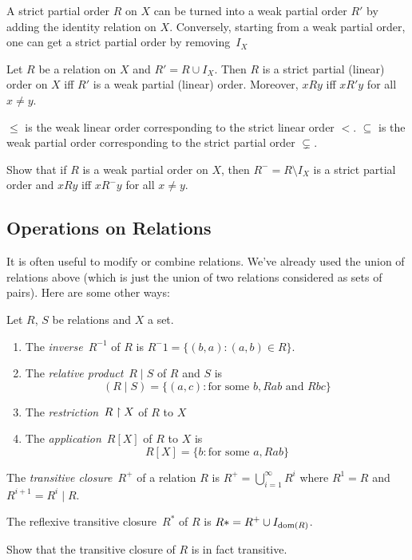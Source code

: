 \documentclass[misc]{subfiles}
\begin{document}
A strict partial order $R$ on $X$ can be turned into a weak partial
order $R'$ by adding the identity relation on $X$.
Conversely, starting from a weak partial order, one can get a strict
partial order by removing~$I_{X}$

\begin{prop}
Let $R$ be a relation on $X$ and $R'= R \cup I{}_{X}$. Then
$R$ is a strict partial (linear) order on $X$ iff $R'$ is a weak
partial (linear) order. Moreover, $xRy$ iff $xR'y$ for all $x\neq y$.\end{prop}

\begin{ex}
$\le$ is the weak linear order corresponding to the strict linear
order $<$. $\subseteq$ is the weak partial order corresponding to
the strict partial order $\subsetneq$.
\end{ex}

\begin{prob}
Show that if $R$ is a weak partial order on $X$, then $R^{-} = R\setminus I_{X}$
is a strict partial order and $xRy$ iff $xR^{-}y$ for all $x\neq y$.\end{prob}

\subsection{Operations on Relations}

It is often useful to modify or combine relations. We've already used the union of relations above (which is just the union of two relations considered as sets of pairs). Here are some other ways:

\begin{defn} Let $R$, $S$ be relations and $X$ a set.
\begin{enumerate}
\item The \emph{inverse}~$R^{-1}$ of $R$ is $R^-1 = \{ (b, a) : (a, b) \in R\}$.
\item The \emph{relative product}~$R \mid S$ of $R$ and $S$ is 
\[
(R \mid S) = \{(a, c) : \text{for some }b, Rab \text{ and } Rbc\}
\]
\item The \emph{restriction}~$R \upharpoonright X$ of $R$ to $X$
\item The \emph{application}~$R[X]$ of $R$ to $X$ is
\[
R[X] = \{b : \text{for some }a, Rab\}
\]
\end{enumerate}
\end{defn}

\begin{defn}
The \emph{transitive closure}~$R^+$ of a relation $R$ is $R^+ = \bigcup_{i=1}^\infty R^i$ where $R^1 = R$ and $R^{i+1} = R^i \mid R$.

The reflexive transitive closure~$R^*$ of $R$ is $R* = R^+ \cup I_{\mathrm{dom}(R)}$.
\end{defn}

\begin{prob}
Show that the transitive closure of $R$ is in fact transitive.
\end{prob}
\end{document}
